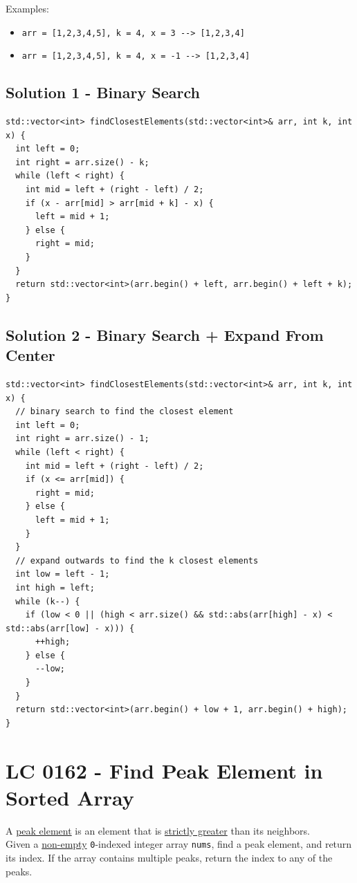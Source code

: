 Examples:
\begin{itemize}
\item {\colorbox{CodeBackground}{\lstinline|arr = [1,2,3,4,5], k = 4, x = 3 --> [1,2,3,4]|}}
\item {\colorbox{CodeBackground}{\lstinline|arr = [1,2,3,4,5], k = 4, x = -1 --> [1,2,3,4]|}}
\end{itemize}

\subsection*{Solution 1 - Binary Search}
\begin{lstlisting}
std::vector<int> findClosestElements(std::vector<int>& arr, int k, int x) {
  int left = 0;
  int right = arr.size() - k;
  while (left < right) {
    int mid = left + (right - left) / 2;
    if (x - arr[mid] > arr[mid + k] - x) {
      left = mid + 1;
    } else {
      right = mid;
    }
  }
  return std::vector<int>(arr.begin() + left, arr.begin() + left + k);
}
\end{lstlisting}

\subsection*{Solution 2 - Binary Search + Expand From Center}
\begin{lstlisting}
std::vector<int> findClosestElements(std::vector<int>& arr, int k, int x) {
  // binary search to find the closest element
  int left = 0;
  int right = arr.size() - 1;
  while (left < right) {
    int mid = left + (right - left) / 2;
    if (x <= arr[mid]) {
      right = mid;
    } else {
      left = mid + 1;
    }
  }
  // expand outwards to find the k closest elements
  int low = left - 1;
  int high = left;
  while (k--) {
    if (low < 0 || (high < arr.size() && std::abs(arr[high] - x) < std::abs(arr[low] - x))) {
      ++high;
    } else {
      --low;
    }
  }
  return std::vector<int>(arr.begin() + low + 1, arr.begin() + high);
}
\end{lstlisting}

\section{LC 0162 - Find Peak Element in Sorted Array}
A \ul{peak element} is an element that is \ul{strictly greater} than its neighbors.\\

Given a \ul{non-empty} {\colorbox{CodeBackground}{\lstinline|0|}}-indexed integer array {\colorbox{CodeBackground}{\lstinline|nums|}}, find a peak element, and return its index. If the array contains multiple peaks, return the index to any of the peaks.\\


